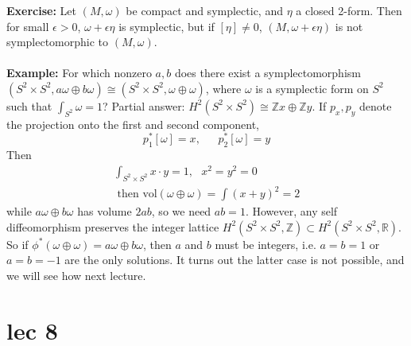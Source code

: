 \documentclass[12pt]{report}
\theoremstyle{definition}
\theoremstyle{remark}
\numberwithin{equation}{section}
\theoremstyle{definition}
\newcommand{\bb}[1]{\mathbb{#1}}
\begin{document}
\textbf{Exercise: } Let $(M,\omega)$ be compact and symplectic, and $\eta$ a closed 2-form. Then for small $\epsilon > 0$, $\omega + \epsilon \eta$ is symplectic, but if $[\eta] \ne 0$, $(M, \omega + \epsilon \eta)$ is not symplectomorphic to $(M,\omega)$. \\\\
\textbf{Example: }For which nonzero $a,b$ does there exist a symplectomorphism $(S^2 \times S^2, a\omega \oplus b\omega) \cong (S^2 \times S^2, \omega \oplus \omega)$, where $\omega$ is a symplectic form on $	S^2$ such that $\int_{S^2} \omega = 1$? Partial answer: $H^2(S^2 \times S^2) \cong \bb Zx \oplus \bb Z y$. If $p_x, p_y$ denote the projection onto the first and second component, 
$$
	p_1^*[\omega] = x,\ \ \ \ \ \ \ p_2^*[\omega] = y
$$
Then
\begin{gather*}
	\int_{S^2 \times S^2} x \cdot y = 1,\ \ \ x^2 = y^2 = 0\\
	\text{ then vol}(\omega \oplus \omega) = \int (x + y )^2 = 2 
\end{gather*}
while $a\omega \oplus b \omega$ has volume $2ab$, so we need $ab = 1$. However, any self diffeomorphism preserves the integer lattice $H^2(S^2 \times S^2, \bb Z) \subset H^2(S^2 \times S^2, \bb R)$. So if $\phi^*(\omega \oplus \omega) = a\omega \oplus b \omega$, then $a$ and $b$ must be integers, i.e. $a = b = 1$ or $a = b = -1$ are the only solutions. It turns out the latter case is not possible, and we will see how next lecture.
\chapter{lec 8}
\end{document}
